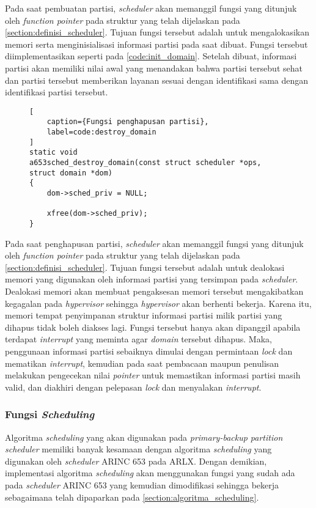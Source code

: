 Pada saat pembuatan partisi, \textit{scheduler} akan memanggil fungsi yang ditunjuk oleh
\textit{function pointer}  pada struktur yang telah dijelaskan pada
\autoref{section:definisi_scheduler}. Tujuan fungsi tersebut adalah untuk mengalokasikan memori
serta menginisialisasi informasi partisi pada saat dibuat. Fungsi tersebut diimplementasikan
seperti pada \autoref{code:init_domain}. Setelah dibuat, informasi partisi akan memiliki nilai
awal yang menandakan bahwa partisi tersebut sehat dan partisi tersebut memberikan layanan sesuai
dengan identifikasi sama dengan identifikasi partisi tersebut.


\begin{figure}[!ht]
\begin{lstlisting}[
	caption={Fungsi penghapusan partisi},
	label=code:destroy_domain
]
static void
a653sched_destroy_domain(const struct scheduler *ops, struct domain *dom)
{
    dom->sched_priv = NULL;

    xfree(dom->sched_priv);
}
\end{lstlisting}
\end{figure}

Pada saat penghapusan partisi, \textit{scheduler} akan memanggil fungsi yang ditunjuk oleh
\textit{function pointer}  pada struktur yang telah dijelaskan pada
\autoref{section:definisi_scheduler}. Tujuan fungsi tersebut adalah untuk dealokasi memori yang
digunakan oleh informasi partisi yang tersimpan pada \textit{scheduler}. Dealokasi memori akan
membuat pengaksesan memori tersebut mengakibatkan kegagalan pada \textit{hypervisor} sehingga
\textit{hypervisor} akan berhenti bekerja. Karena itu, memori tempat penyimpanan struktur
informasi partisi milik partisi yang dihapus tidak boleh diakses lagi. Fungsi tersebut hanya
akan dipanggil apabila terdapat \textit{interrupt} yang meminta agar \textit{domain} tersebut
dihapus. Maka, penggunaan informasi partisi sebaiknya dimulai dengan permintaan \textit{lock}
dan mematikan \textit{interrupt}, kemudian pada saat pembacaan maupun penulisan melakukan
pengecekan nilai \textit{pointer} untuk memastikan informasi partisi masih valid, dan diakhiri
dengan pelepasan \textit{lock} dan menyalakan \textit{interrupt}.

\subsubsection{Fungsi \textit{Scheduling}}
\label{section:scheduling_impl}

Algoritma \textit{scheduling} yang akan digunakan pada \textit{primary-backup partition
scheduler} memiliki banyak kesamaan dengan algoritma \textit{scheduling} yang digunakan oleh
\textit{scheduler} ARINC 653 pada ARLX. Dengan demikian, implementasi algoritma
\textit{scheduling} akan menggunakan fungsi yang sudah ada pada \textit{scheduler} ARINC 653
yang kemudian dimodifikasi sehingga bekerja sebagaimana telah dipaparkan pada
\autoref{section:algoritma_scheduling}.

